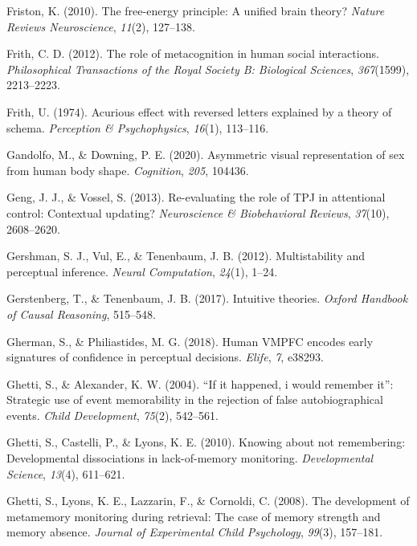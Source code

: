 \documentclass[12pt,twoside]{reedthesis}
\newenvironment{CSLReferences}%
  {}%
  {\par}
\begin{document}
\begin{CSLReferences}{1}{0}
\leavevmode\hypertarget{ref-friston2010free}{}%
Friston, K. (2010). The free-energy principle: A unified brain theory? \emph{Nature Reviews Neuroscience}, \emph{11}(2), 127--138.

\leavevmode\hypertarget{ref-frith2012role}{}%
Frith, C. D. (2012). The role of metacognition in human social interactions. \emph{Philosophical Transactions of the Royal Society B: Biological Sciences}, \emph{367}(1599), 2213--2223.

\leavevmode\hypertarget{ref-frith1974acurious}{}%
Frith, U. (1974). Acurious effect with reversed letters explained by a theory of schema. \emph{Perception \& Psychophysics}, \emph{16}(1), 113--116.

\leavevmode\hypertarget{ref-gandolfo2020asymmetric}{}%
Gandolfo, M., \& Downing, P. E. (2020). Asymmetric visual representation of sex from human body shape. \emph{Cognition}, \emph{205}, 104436.

\leavevmode\hypertarget{ref-geng2013re}{}%
Geng, J. J., \& Vossel, S. (2013). Re-evaluating the role of TPJ in attentional control: Contextual updating? \emph{Neuroscience \& Biobehavioral Reviews}, \emph{37}(10), 2608--2620.

\leavevmode\hypertarget{ref-gershman2012multistability}{}%
Gershman, S. J., Vul, E., \& Tenenbaum, J. B. (2012). Multistability and perceptual inference. \emph{Neural Computation}, \emph{24}(1), 1--24.

\leavevmode\hypertarget{ref-gerstenberg2017intuitive}{}%
Gerstenberg, T., \& Tenenbaum, J. B. (2017). Intuitive theories. \emph{Oxford Handbook of Causal Reasoning}, 515--548.

\leavevmode\hypertarget{ref-gherman2018human}{}%
Gherman, S., \& Philiastides, M. G. (2018). Human VMPFC encodes early signatures of confidence in perceptual decisions. \emph{Elife}, \emph{7}, e38293.

\leavevmode\hypertarget{ref-ghetti2004if}{}%
Ghetti, S., \& Alexander, K. W. (2004). {``If it happened, i would remember it''}: Strategic use of event memorability in the rejection of false autobiographical events. \emph{Child Development}, \emph{75}(2), 542--561.

\leavevmode\hypertarget{ref-ghetti2010knowing}{}%
Ghetti, S., Castelli, P., \& Lyons, K. E. (2010). Knowing about not remembering: Developmental dissociations in lack-of-memory monitoring. \emph{Developmental Science}, \emph{13}(4), 611--621.

\leavevmode\hypertarget{ref-ghetti2008development}{}%
Ghetti, S., Lyons, K. E., Lazzarin, F., \& Cornoldi, C. (2008). The development of metamemory monitoring during retrieval: The case of memory strength and memory absence. \emph{Journal of Experimental Child Psychology}, \emph{99}(3), 157--181.


\end{CSLReferences}
\end{document}
